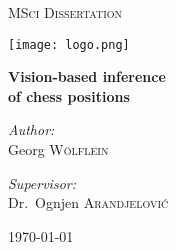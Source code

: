 \begin{titlepage}
	\centering
	
	{\scshape\LARGE MSci Dissertation\par}
	\vspace{0.25cm}
	{\texttt{[image: logo.png]} \par}
	\vspace{0.25cm}
	{\huge\bfseries Vision-based inference\\of chess positions\par}
	\vspace{0.5cm}

	\vfill

	\noindent
	\begin{minipage}{0.45\textwidth}
		\begin{center} \large
		  \textit{Author:}\\
          Georg \textsc{Wölflein}\\
		\end{center}
    \end{minipage}%
    \begin{minipage}{0.45\textwidth}
		\begin{center} \large
		\textit{Supervisor:} \\
		Dr.~Ognjen \textsc{Arandjelović}
		\end{center}
	\end{minipage}%

	\vfill

	{\today\par}
\end{titlepage}
